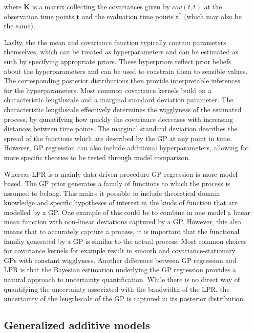 \documentclass[man, floatsintext]{apa7}
\begin{document}
\noindent where $\textbf{K}$ is a matrix collecting the covariances given by
$cov(t, t)$ at the observation time points $\textbf{t}$ and the evaluation time
points $\textbf{t}^*$ (which may also be the same).

Laslty, the the mean and covariance function typically contain parameters
themselves, which can be treated as hyperparameters and can be estimated as
such by specifying appropriate priors. These hyperpriors reflect prior beliefs
about the hyperparameters and can be used to constrain them to sensible values.
The corresponding posterior distributions then provide interpretable inferences
for the hyperparameters. Most common covariance kernels build on a
characteristic lengthscale and a marginal standard deviation parameter. The
characteristic lengthscale effectively determines the wigglyness of the
estimated process, by qunatifying how quickly the covariance decreases with
increasing distances between time points. The marginal standard deviation
describes the spread of the functions which are described by the GP at any
point in time. However, GP regression can also include additional
hyperparameters, allowing for more specific theories to be tested through model
comparison.

Whereas LPR is a mainly data driven procedure GP regression is more model
based. The GP prior generates a family of functions to which the process is
assumed to belong. This makes it possible to include theoretical domain
knowledge and specific hypotheses of interest in the kinds of function that are
modelled by a GP\@. One example of this could be to combine in one model a
linear mean function with non-linear deviations captured by a GP\@. However,
this also means that to accurately capture a process, it is important that the
functional familiy generated by a GP is similar to the actual process. Most
common choices for covariance kernels for example result in smooth and
covariance-stationary GPs with constant wigglyness. Another difference between
GP regression and LPR is that the Bayesian estimation underlying the GP
regression provides a natural approach to uncertainty quantification. While
there is no direct way of quantifying the uncertainty associated with the
bandwidth of the LPR, the uncertainty of the lengthscale of the GP is captured
in its posterior distribution.

\subsection{Generalized additive models}
\end{document}
